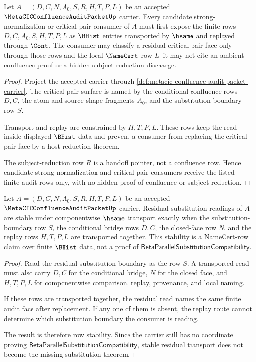 \begin{theorem}
\label{thm:metacic-confluence-audit-critical-pair-obligations}
Let $A=(D,C,N,A_0,S,R,H,T,P,L)$ be an accepted $\MetaCICConfluenceAuditPacketUp$ carrier. Every candidate strong-normalization or critical-pair consumer of $A$ must first expose the finite rows $D,C,A_0,S,H,T,P,L$ as $\BHist$ entries transported by $\hsame$ and replayed through $\Cont$. The consumer may classify a residual critical-pair face only through those rows and the local $\NameCert$ row $L$; it may not cite an ambient confluence proof or a hidden subject-reduction discharge.
\end{theorem}
\begin{proof}
Project the accepted carrier through \autoref{def:metacic-confluence-audit-packet-carrier}. The critical-pair surface is named by the conditional confluence rows $D,C$, the atom and source-shape fragments $A_0$, and the substitution-boundary row $S$.

Transport and replay are constrained by $H,T,P,L$. These rows keep the read inside displayed $\BHist$ data and prevent a consumer from replacing the critical-pair face by a host reduction theorem.

The subject-reduction row $R$ is a handoff pointer, not a confluence row. Hence candidate strong-normalization and critical-pair consumers receive the listed finite audit rows only, with no hidden proof of confluence or subject reduction.
\end{proof}

\begin{theorem}
\label{thm:metacic-confluence-audit-residual-stability}
Let $A=(D,C,N,A_0,S,R,H,T,P,L)$ be an accepted $\MetaCICConfluenceAuditPacketUp$ carrier. Residual substitution readings of $A$ are stable under componentwise $\hsame$ transport exactly when the substitution-boundary row $S$, the conditional bridge rows $D,C$, the closed-face row $N$, and the replay rows $H,T,P,L$ are transported together. This stability is a NameCert-row claim over finite $\BHist$ data, not a proof of $\mathsf{BetaParallelSubstitutionCompatibility}$.
\end{theorem}
\begin{proof}
Read the residual-substitution boundary as the row $S$. A transported read must also carry $D,C$ for the conditional bridge, $N$ for the closed face, and $H,T,P,L$ for componentwise comparison, replay, provenance, and local naming.

If these rows are transported together, the residual read names the same finite audit face after replacement. If any one of them is absent, the replay route cannot determine which substitution boundary the consumer is reading.

The result is therefore row stability. Since the carrier still has no coordinate proving $\mathsf{BetaParallelSubstitutionCompatibility}$, stable residual transport does not become the missing substitution theorem.
\end{proof}

